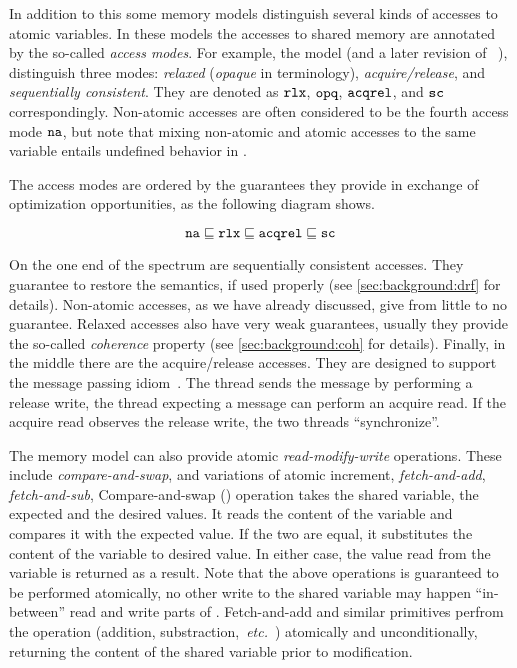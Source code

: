 In addition to this some memory models distinguish 
several kinds of accesses to atomic variables.
In these models the accesses to shared memory are annotated by the 
so-called \emph{access modes}.
For example, the \CPP model (and a later revision of 
\Java~\cite{Bender-Palsberg:OOPSLA19}), distinguish 
three modes: \emph{relaxed} (\emph{opaque} in \Java terminology), 
\emph{acquire/release}, and \emph{sequentially consistent}.
They are denoted as $\mathtt{rlx}$, $\mathtt{opq}$, ${\mathtt{acqrel}}$, and ${\mathtt{sc}}$ correspondingly.
Non-atomic accesses are often considered to be the fourth access mode $\mathtt{na}$, 
but note that mixing non-atomic and atomic accesses to the same variable 
entails undefined behavior in \CPP.

The access modes are ordered by the guarantees they provide
in exchange of optimization opportunities, as the following 
diagram shows.

$$ \mathtt{na} \sqsubseteq \mathtt{rlx} \sqsubseteq {\mathtt{acqrel}} \sqsubseteq {\mathtt{sc}} $$

On the one end of the spectrum are sequentially consistent accesses. 
They guarantee to restore the \SC semantics, if used properly 
(see \cref{sec:background:drf} for details).
Non-atomic accesses, as we have already discussed, give 
from little to no guarantee. 
Relaxed accesses also have very weak guarantees, 
usually they provide the so-called \emph{coherence} property
(see \cref{sec:background:coh} for details).
Finally, in the middle there are the acquire/release accesses. 
They are designed to support the message passing idiom~\cite{Lahav-al:POPL16}.
The thread sends the message by performing a release write, 
the thread expecting a message can perform an acquire read. 
If the acquire read observes the release write, the two 
threads ``synchronize''. 

The memory model can also provide atomic \emph{read-modify-write} operations.
These include \emph{compare-and-swap}, and variations of atomic increment,
\eg \emph{fetch-and-add}, \emph{fetch-and-sub}, \etc 
Compare-and-swap (\CAS) operation takes the shared variable, the expected 
and the desired values. It reads the content of the variable
and compares it with the expected value. If the two are equal,
it substitutes the content of the variable to desired value. 
In either case, the value read from the variable is returned as a result. 
Note that the above operations is guaranteed to be performed atomically, 
no other write to the shared variable may happen ``in-between'' 
read and write parts of \CAS.
Fetch-and-add and similar primitives perfrom 
the operation (addition, substraction,~\emph{etc.}~)
atomically and unconditionally, returning 
the content of the shared variable prior to modification.  

